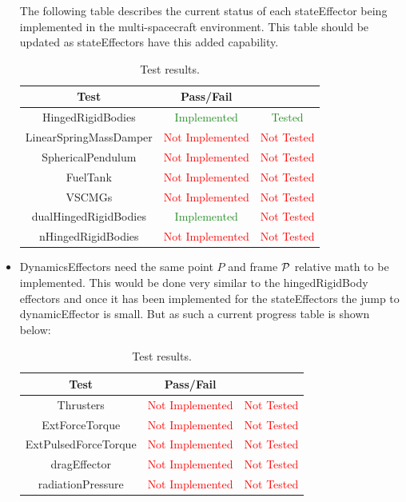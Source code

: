 \begin{itemize}
The following table describes the current status of each stateEffector being implemented in the multi-spacecraft environment. This table should be updated as stateEffectors have this added capability.

\begin{table}[htbp]
	\caption{Test results.}
	\label{tab:results}
	\centering \fontsize{10}{10}\selectfont
	\begin{tabular}{c | c | c } %
		\hline
		\textbf{Test} 				    & \textbf{Pass/Fail} &  \\ \hline
		HingedRigidBodies  & \textcolor{ForestGreen}{Implemented} & \textcolor{ForestGreen}{Tested} \\
		LinearSpringMassDamper  & \textcolor{Red}{Not Implemented} & \textcolor{Red}{Not Tested} \\
		SphericalPendulum  & \textcolor{Red}{Not Implemented} & \textcolor{Red}{Not Tested} \\
		FuelTank  & \textcolor{Red}{Not Implemented} & \textcolor{Red}{Not Tested} \\
		VSCMGs  & \textcolor{Red}{Not Implemented} & \textcolor{Red}{Not Tested} \\
		dualHingedRigidBodies  & \textcolor{ForestGreen}{Implemented} & \textcolor{Red}{Not Tested} \\
		nHingedRigidBodies  & \textcolor{Red}{Not Implemented} & \textcolor{Red}{Not Tested} \\
		\hline
	\end{tabular}
\end{table}
\clearpage

\item DynamicsEffectors need the same point $P$ and frame $\cal P$ relative math to be implemented. This would be done very similar to the hingedRigidBody effectors and once it has been implemented for the stateEffectors the jump to dynamicEffector is small. But as such a current progress table is shown below:

\begin{table}[htbp]
	\caption{Test results.}
	\label{tab:results2}
	\centering \fontsize{10}{10}\selectfont
	\begin{tabular}{c | c | c } %
		\hline
		\textbf{Test} 				    & \textbf{Pass/Fail} &  \\ \hline
		Thrusters  & \textcolor{Red}{Not Implemented} & \textcolor{Red}{Not Tested} \\
		ExtForceTorque  & \textcolor{Red}{Not Implemented} & \textcolor{Red}{Not Tested} \\
		ExtPulsedForceTorque  & \textcolor{Red}{Not Implemented} & \textcolor{Red}{Not Tested} \\
		dragEffector  & \textcolor{Red}{Not Implemented} & \textcolor{Red}{Not Tested} \\
		radiationPressure  & \textcolor{Red}{Not Implemented} & \textcolor{Red}{Not Tested} \\
		\hline
	\end{tabular}
\end{table}


\end{itemize}
